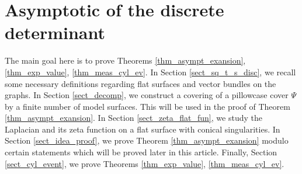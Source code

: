 \documentclass[12pt]{article}
\numberwithin{equation}{section}
\theoremstyle{theorem}
\theoremstyle{definition}
\theoremstyle{remark}
\begin{document}
\section{Asymptotic of the discrete determinant}\label{sec_main_asymp}
	The main goal here is to prove Theorems \ref{thm_asympt_exansion}, \ref{thm_exp_value}, \ref{thm_meas_cyl_ev}.
	In Section \ref{sect_sq_t_s_disc}, we recall some necessary definitions regarding flat surfaces and vector bundles on the graphs. 
	In Section \ref{sect_decomp}, we construct a covering of a pillowcase cover $\Psi$ by a finite number of model surfaces. This will be used in the proof of Theorem \ref{thm_asympt_exansion}.
	In Section \ref{sect_zeta_flat_fun}, we study the Laplacian and its zeta function on a flat surface with conical singularities.
	In Section \ref{sect_idea_proof}, we prove  Theorem \ref{thm_asympt_exansion} modulo certain statements which will be proved later in this article.
	Finally, Section \ref{sect_cyl_event}, we prove Theorems \ref{thm_exp_value}, \ref{thm_meas_cyl_ev}.
	
	
\end{document}
